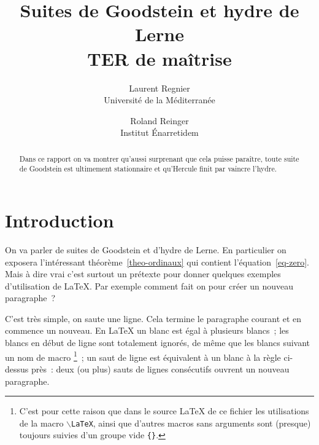 \documentclass{article}
\author{Laurent Regnier\\
        Université de la Méditerranée
        \and 
        Roland Reinger\\
        Institut Énarretidem
}
\title{Suites de Goodstein et hydre de Lerne\\
       \small TER de maîtrise}
\begin{document}
\maketitle

\begin{abstract}
  Dans ce rapport on va montrer qu'aussi surprenant que cela puisse paraître,
  toute suite de Goodstein est ultimement stationnaire et qu'Hercule finit par
  vaincre l'hydre.
\end{abstract}

\tableofcontents

\section{Introduction}
On va parler de suites de Goodstein et d'hydre de Lerne. En particulier on
exposera l'intéressant théorème~\ref{theo-ordinaux} %
qui contient l'équation~\ref{eq-zero}.  Mais à dire vrai c'est surtout un
prétexte pour donner quelques exemples d'utilisation de \LaTeX. Par exemple
comment fait on pour créer un nouveau paragraphe~?

C'est très simple, on saute une ligne. Cela termine le paragraphe courant et
en commence un nouveau. En \LaTeX{} un blanc est égal à    plusieurs   blancs~;
les blancs en début de ligne sont totalement ignorés, de même que les blancs
suivant un nom de macro%
\footnote{C'est pour cette raison que dans le source \LaTeX{} de ce
  fichier les utilisations de la macro \texttt{$\backslash$LaTeX},
  ainsi que d'autres macros sans arguments sont (presque) toujours
  suivies d'un groupe vide \texttt{\{\}}.%
}~;
un saut de ligne est équivalent à un blanc à la règle ci-dessus près~: deux (ou
plus) sauts de lignes consécutifs ouvrent un nouveau paragraphe.
\end{document}
